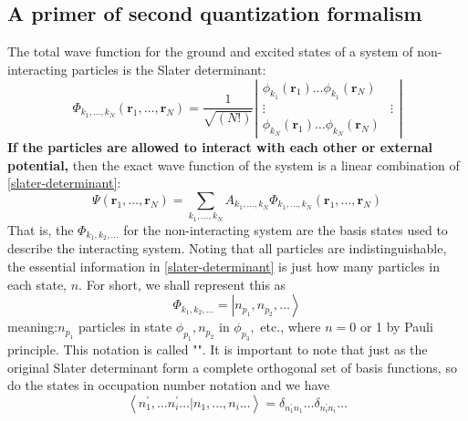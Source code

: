\subsection{A primer of second quantization formalism}
The total wave function for the ground and excited states of a system of non-interacting particles is the Slater determinant:
\begin{equation}\Phi_{k_{1}, \ldots, k_{N}}\left(\mathbf{r}_{1}, \ldots, \mathbf{r}_{N}\right)=\frac{1}{\sqrt{(N !)}}\left|\begin{array}{cc}
\phi_{k_{1}}\left(\mathbf{r}_{1}\right) \ldots \phi_{k_{1}}\left(\mathbf{r}_{N}\right) \\
\vdots & \vdots \\
\phi_{k_{N}}\left(\mathbf{r}_{1}\right) \ldots \phi_{k_{N}}\left(\mathbf{r}_{N}\right)
\end{array}\right|
\label{slater-determinant}
\end{equation}
\textbf{If the particles are allowed to interact with each other or external potential,} then the exact wave function of the system is a linear combination of \ref{slater-determinant}:
\begin{equation}\Psi\left(\mathbf{r}_{1}, \ldots, \mathbf{r}_{N}\right)=\sum_{k_{1}, \ldots, k_{N}} A_{k_{1}, \ldots, k_{N}} \Phi_{k_{1}, \ldots, k_{N}}\left(\mathbf{r}_{1}, \ldots, \mathbf{r}_{N}\right)\end{equation}
That is, the $\Phi_{k_1,k_2,\ldots}$ for the non-interacting system are the basis states used to describe the interacting system. Noting that all particles are indistinguishable, the essential information in \ref{slater-determinant} is just how many particles in each state, $n$. For short, we shall represent this as
\begin{equation}
    \Phi_{k_1,k_2,\ldots}=\left|n_{p_1},n_{p_2},\ldots\right\rangle
\end{equation}
meaning:$n_{p_{1}}$ particles in state $\phi_{p_{1}}, n_{p_{2}}$ in $\phi_{p_{3}},$ etc., where $n=0$ or 1 by Pauli principle. This notation is called "". It is important to note that just as the original Slater determinant form a complete orthogonal set of basis functions, so do the states in occupation number notation and we have
\begin{equation}\left\langle n_{1}^{\prime}, \ldots n_{i}^{\prime} \ldots | n_{1}, \ldots, n_{i} \ldots\right\rangle=\delta_{n_1^{\prime}n_1}\ldots\delta_{n_i^{\prime}n_i}\ldots
\end{equation}
